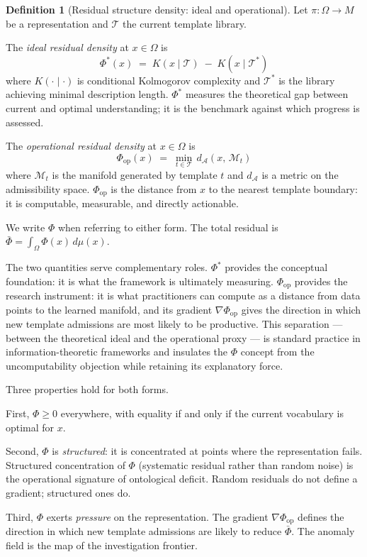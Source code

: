 \documentclass[11pt, a4paper]{article}
\theoremstyle{plain}
\theoremstyle{definition}
\newtheorem{definition}[theorem]{Definition}
\theoremstyle{remark}
\newcommand{\Adm}{\mathcal{A}}
\newcommand{\Proj}{\pi}
\newcommand{\PhiF}{\varPhi}
\newcommand{\PhiFop}{\varPhi_{\mathrm{op}}}
\newcommand{\PhiFid}{\varPhi^{*}}
\newcommand{\Tlib}{\mathcal{T}}
\begin{document}
\begin{definition}[Residual structure density: ideal and operational]
\label{def:phi}
Let $\Proj : \Omega \to M$ be a representation and $\Tlib$ the current
template library.

The \emph{ideal residual density} at $x \in \Omega$ is
\[
  \PhiFid(x) \;=\; K(x \mid \Tlib) \;-\; K(x \mid \Tlib^*)
\]
where $K(\cdot \mid \cdot)$ is conditional Kolmogorov complexity and
$\Tlib^*$ is the library achieving minimal description length.
$\PhiFid$ measures the theoretical gap between current and optimal
understanding; it is the benchmark against which progress is assessed.

The \emph{operational residual density} at $x \in \Omega$ is
\[
  \PhiFop(x) \;=\; \min_{t \in \Tlib}\, d_{\Adm}(x,\, \mathcal{M}_t)
\]
where $\mathcal{M}_t$ is the manifold generated by template $t$ and
$d_{\Adm}$ is a metric on the admissibility space.
$\PhiFop$ is the distance from $x$ to the nearest template boundary:
it is computable, measurable, and directly actionable.

We write $\PhiF$ when referring to either form.
The total residual is $\bar\PhiF = \int_\Omega \PhiF(x)\,d\mu(x)$.
\end{definition}

The two quantities serve complementary roles. $\PhiFid$ provides the
conceptual foundation: it is what the framework is ultimately measuring.
$\PhiFop$ provides the research instrument: it is what practitioners
can compute as a distance from data points to the learned manifold,
and its gradient $\nabla\PhiFop$ gives the direction in which new
template admissions are most likely to be productive.
This separation --- between the theoretical ideal and the operational
proxy --- is standard practice in information-theoretic frameworks
and insulates the $\PhiF$ concept from the uncomputability objection
while retaining its explanatory force.

Three properties hold for both forms.

First, $\PhiF \geq 0$ everywhere, with equality if and only if
the current vocabulary is optimal for $x$.

Second, $\PhiF$ is \emph{structured}: it is concentrated at points
where the representation fails. Structured concentration of $\PhiF$
(systematic residual rather than random noise) is the operational
signature of ontological deficit. Random residuals do not define a
gradient; structured ones do.

Third, $\PhiF$ exerts \emph{pressure} on the representation.
The gradient $\nabla\PhiFop$ defines the direction in which new template
admissions are likely to reduce $\bar\PhiF$. The anomaly field is the
map of the investigation frontier.
\end{document}
